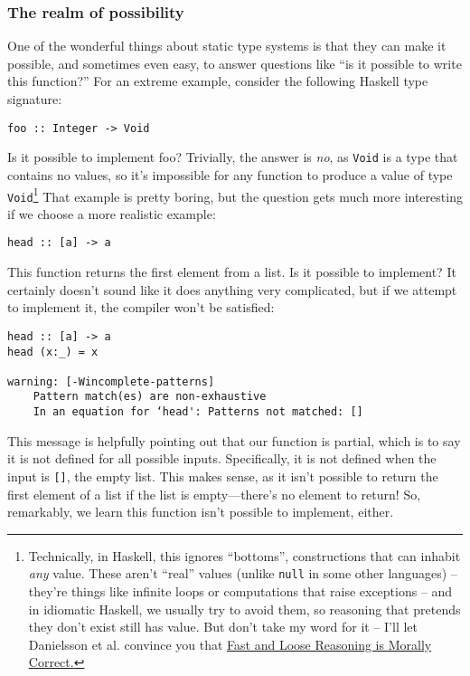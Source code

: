 \subsubsection{The realm of possibility}

One of the wonderful things about static type systems is that they can make it possible, and sometimes even easy, to answer questions like ``is it possible to write this function?'' For an extreme example, consider the following Haskell type signature:

\begin{verbatim}
foo :: Integer -> Void
\end{verbatim}
Is it possible to implement foo? Trivially, the answer is \textit{no}, as \texttt{Void} is a type that contains no values, so it's impossible for any function to produce a value of type \texttt{Void}\footnote{Technically, in Haskell, this ignores ``bottoms'', constructions that can inhabit \textit{any} value. These aren't ``real'' values (unlike \texttt{null} in some other languages) -- they're things like infinite loops or computations that raise exceptions -- and in idiomatic Haskell, we usually try to avoid them, so reasoning that pretends they don't exist still has value. But don't take my word for it -- I'll let Danielsson et al. convince you that \href{https://www.cs.ox.ac.uk/jeremy.gibbons/publications/fast+loose.pdf}{Fast and Loose Reasoning is Morally Correct.}} That example is pretty boring, but the question gets much more interesting if we choose a more realistic example:

\begin{verbatim}
head :: [a] -> a
\end{verbatim}
This function returns the first element from a list. Is it possible to implement? It certainly doesn't sound like it does anything very complicated, but if we attempt to implement it, the compiler won't be satisfied:

\begin{verbatim}
head :: [a] -> a
head (x:_) = x

warning: [-Wincomplete-patterns]
    Pattern match(es) are non-exhaustive
    In an equation for ‘head': Patterns not matched: []
\end{verbatim}
This message is helpfully pointing out that our function is partial, which is to say it is not defined for all possible inputs. Specifically, it is not defined when the input is \texttt{[]}, the empty list. This makes sense, as it isn't possible to return the first element of a list if the list is empty—there's no element to return! So, remarkably, we learn this function isn't possible to implement, either.
